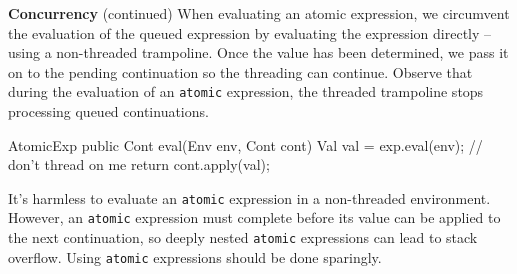 \begin{minipage}[t]{\sw}
\slidenumber
\LARGE
{\bf Concurrency} (continued)\exx
When evaluating an atomic expression,
we circumvent the evaluation of the queued expression
by evaluating the expression directly --
using a non-threaded trampoline.
Once the value has been determined,
we pass it on to the pending continuation
so the threading can continue.
Observe that during the evaluation of an \verb'atomic' expression,
the threaded trampoline stops processing queued continuations.
\Large
\begin{qv}
AtomicExp
    public Cont eval(Env env, Cont cont) {
        Val val = exp.eval(env); // don't thread on me
        return cont.apply(val);
    }
\end{qv}
\LARGE
It's harmless to evaluate an \verb'atomic' expression
in a non-threaded environment.
However, an \verb'atomic' expression must complete
before its value can be applied to the next continuation,
so deeply nested \verb'atomic' expressions can lead to stack overflow.
Using \verb'atomic' expressions should be done sparingly.
\end{minipage}
